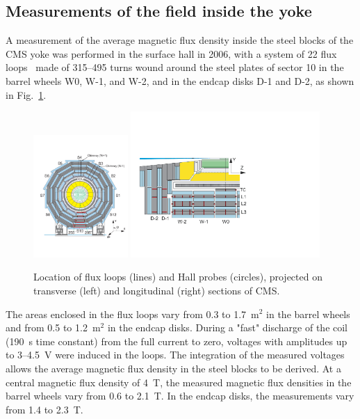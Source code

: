 \subsection{Measurements of the field inside the yoke}

A measurement of the average magnetic flux density inside the steel
blocks of the CMS yoke was performed in the surface hall in 2006, with
a system of 22 flux loops~\cite{CERN:042} made of 315--495 turns wound
around the steel plates of sector 10 in the barrel wheels W0, W-1, and W-2,
and in the endcap disks D-1 and D-2, as shown in Fig.~\ref{fig:HallFlux}.
\begin{figure}[hbtp]
  \begin{center}
    \includegraphics[width=0.32\textwidth]{fig/probes_transverse}
    \hfill
    \includegraphics[width=0.64\textwidth]{fig/probes_longitudinal}
    \hfill
    \caption{Location of flux loops (lines) and Hall probes (circles),
      projected on transverse (left) and longitudinal (right)
      sections of CMS.}
    \label{fig:HallFlux}
  \end{center}
\end{figure}
%
The areas enclosed in the flux loops vary from 0.3 to 1.7~m$^2$ in
the barrel wheels and from 0.5 to 1.2~m$^2$ in the endcap disks.
During a "fast" discharge of the coil (190~s time constant) from
the full current to zero, voltages with amplitudes up to 3--4.5~V were
induced in the loops.
The integration of the measured voltages
allows the average
magnetic flux density in the steel blocks to be derived.
At a central magnetic flux density of 4~T, the measured magnetic flux
densities in the barrel wheels vary from 0.6 to 2.1~T.
In the endcap disks, the measurements vary from 1.4 to 2.3~T.

